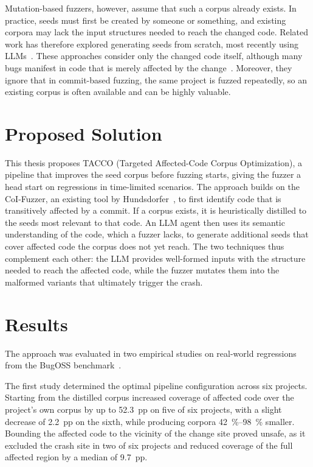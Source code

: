 Mutation-based fuzzers, however, assume that such a corpus already exists.
In practice, seeds must first be created by someone or something, and existing corpora may lack the input structures needed to reach the changed code.
Related work has therefore explored generating seeds from scratch, most recently using \acp{LLM}~\cite{liuEvaluatingLLMBasedRegression2026}.
These approaches consider only the changed code itself, although many bugs manifest in code that is merely affected by the change~\cite{zotero-item-324}.
Moreover, they ignore that in commit-based fuzzing, the same project is fuzzed repeatedly, so an existing corpus is often available and can be highly valuable.

\section{Proposed Solution}
This thesis proposes TACCO (Targeted Affected-Code Corpus Optimization), a pipeline that improves the seed corpus before fuzzing starts, giving the fuzzer a head start on regressions in time-limited scenarios.
The approach builds on the \ac{CoI}-Fuzzer, an existing tool by Hundsdorfer~\cite{zotero-item-324}, to first identify code that is transitively affected by a commit.
If a corpus exists, it is heuristically distilled to the seeds most relevant to that code.
An \ac{LLM} agent then uses its semantic understanding of the code, which a fuzzer lacks, to generate additional seeds that cover affected code the corpus does not yet reach.
The two techniques thus complement each other: the \ac{LLM} provides well-formed inputs with the structure needed to reach the affected code, while the fuzzer mutates them into the malformed variants that ultimately trigger the crash.

\section{Results}
The approach was evaluated in two empirical studies on real-world regressions from the BugOSS benchmark~\cite{kimBugOssBenchmarkRealworld2024}.

The first study determined the optimal pipeline configuration across six projects.
Starting from the distilled corpus increased coverage of affected code over the project's own corpus by up to \SI{52.3}{pp} on five of six projects, with a slight decrease of \SI{2.2}{pp} on the sixth, while producing corpora \SIrange{42}{98}{\percent} smaller.
Bounding the affected code to the vicinity of the change site proved unsafe, as it excluded the crash site in two of six projects and reduced coverage of the full affected region by a median of \SI{9.7}{pp}.

